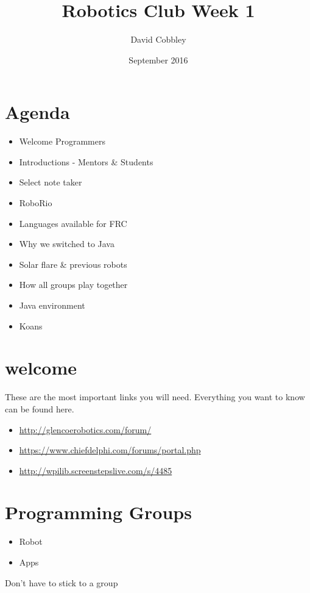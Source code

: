 \documentclass{article}
\title{Robotics Club Week 1}
\author{David Cobbley }
\date{September 2016}
\begin{document}
\maketitle

\section{Agenda}
\begin{itemize}
    
    \item Welcome Programmers
    \item Introductions - Mentors \& Students
    \item Select note taker
    \item RoboRio
    \item Languages available for FRC
    \item Why we switched to Java
    \item Solar flare \& previous robots
    \item How all groups play together
    \item Java environment
    \item Koans
\end{itemize}

\section{welcome}
These are the most important links you will need. Everything you want to know can be found here.
\begin{itemize}
    \item[] \url{http://glencoerobotics.com/forum/}
    \item[] \url{https://www.chiefdelphi.com/forums/portal.php}
    \item[] \url{http://wpilib.screenstepslive.com/s/4485}
\end{itemize}

\section{Programming Groups}
\begin{itemize}
    
    \item Robot
    \item Apps
\end{itemize}
Don't have to stick to a group

\pagebreak
\end{document}
